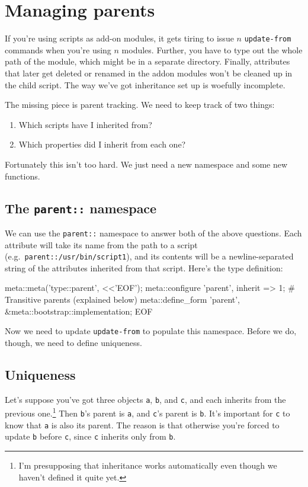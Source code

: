 \documentclass{report}
\begin{document}
\section{Managing parents}\label{sec:cloning-and-inheritance-managing-parents}
    If you're using scripts as add-on modules, it gets tiring to issue $n$ {\tt update-from} commands when you're using $n$ modules. Further, you have to type out the whole path of the module,
    which might be in a separate directory. Finally, attributes that later get deleted or renamed in the addon modules won't be cleaned up in the child script. The way we've got inheritance
    set up is woefully incomplete.

    The missing piece is parent tracking. We need to keep track of two things:

\begin{enumerate}
\item{Which scripts have I inherited from?}
\item{Which properties did I inherit from each one?}
\end{enumerate}

    Fortunately this isn't too hard. We just need a new namespace and some new functions.

\subsection{The {\tt parent::} namespace}\label{sec:cloning-and-inheritance-the-parent-namespace}
      We can use the {\tt parent::} namespace to answer both of the above questions. Each attribute will take its name from the path to a script (e.g.~{\tt parent::/usr/bin/script1}), and its
      contents will be a newline-separated string of the attributes inherited from that script. Here's the type definition:

\begin{perlcode}
meta::meta('type::parent', <<'EOF');
meta::configure 'parent', inherit => 1; # Transitive parents (explained below)
meta::define_form 'parent', \&meta::bootstrap::implementation;
EOF \end{perlcode}

      Now we need to update {\tt update-from} to populate this namespace. Before we do, though, we need to define uniqueness.

\subsection{Uniqueness}\label{sec:cloning-and-inheritance-uniqueness}
      Let's suppose you've got three objects {\tt a}, {\tt b}, and {\tt c}, and each inherits from the previous one.\footnote{I'm presupposing that inheritance works automatically even though
      we haven't defined it quite yet.} Then {\tt b}'s parent is {\tt a}, and {\tt c}'s parent is {\tt b}. It's important for {\tt c} to know that {\tt a} is also its parent. The reason is
      that otherwise you're forced to update {\tt b} before {\tt c}, since {\tt c} inherits only from {\tt b}.
\end{document}
